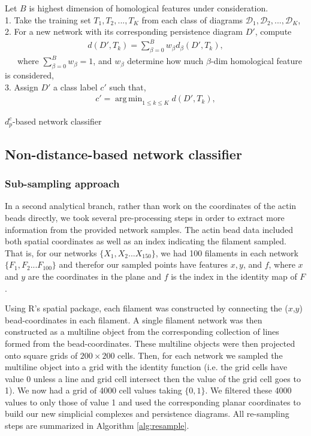 \documentclass[10pt]{article}
\newcommand{\D}{{\mathcal{D}}}
\DeclareMathOperator*{\argminA}{arg\,min} %
\begin{document}
\begin{algorithm}[!htbp]
	Let $B$ is highest dimension of homological features under consideration.\\ 1. Take the training set $T_1, T_2,..., T_K$ from each class of diagrams $\D_1,\D_2,...,\D_K$, \\
	2. For a new network with its corresponding persistence diagram $D'$, compute
	\begin{align}
	    d(D',T_k)=\sum^B_{\beta=0} w_\beta d_\beta (D',T_k),
	\end{align}
	\ \ \  where $\sum^B_{\beta=0}w_\beta=1$, and $w_\beta$ determine how much $\beta$-dim homological feature is considered,\\
	3. Assign $D'$ a class label $c'$ such that,
	\begin{align}
	    c'=\argminA_{1\leq k \leq K} d(D',T_k),
	\end{align}
	\caption{$d^c_p$-based network classifier}
	\label{alg:dpcclassifier}
\end{algorithm}

\subsection{Non-distance-based network classifier}

\subsubsection{Sub-sampling approach}

In a second analytical branch, rather than work on the coordinates of the actin beads directly, we took several pre-processing steps in order to extract more information from the provided network samples. The actin bead data included both spatial coordinates as well as an index indicating the filament sampled. That is, for our networks $\{X_1, X_2... X_{150}\}$, we had 100 filaments in each network $\{F_1, F_2... F_{100}\}$ and therefor our sampled points have features $x, y$, and $f$, where  $x$ and $y$ are the coordinates in the plane and $f$ is the index in the identity map of $F$. 

Using R’s spatial package, each filament was constructed by connecting the ($x$,$y$) bead-coordinates in each filament. A single filament network was then constructed as a multiline object from the corresponding collection of lines formed from the bead-coordinates. These multiline objects were then projected onto square grids of $200\times200$ cells. Then, for each network we sampled the multiline object into a grid with the identity function (i.e. the grid cells have value 0 unless a line and grid cell intersect then the value of the grid cell goes to 1). We now had a grid of 4000 cell values taking $\{0,1\}$. We filtered these 4000 values to only those of value 1 and used the corresponding planar coordinates to build our new simplicial complexes and persistence diagrams. All re-sampling steps are summarized in Algorithm \ref{alg:resample}. 
\end{document}
